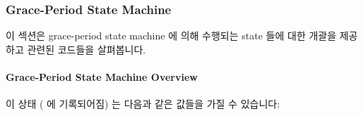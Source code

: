 \subsubsection{Grace-Period State Machine}
\label{app:rcuimpl:Grace-Period State Machine}

이 섹션은 grace-period state machine 에 의해 수행되는 state 들에 대한 개괄을
제공하고 관련된 코드들을 살펴봅니다.

\paragraph{Grace-Period State Machine Overview}
\label{app:rcuimpl:Grace-Period State Machine Overview}

이 상태 ( 에 기록되어짐) 는 다음과 같은 값들을 가질 수
있습니다:

